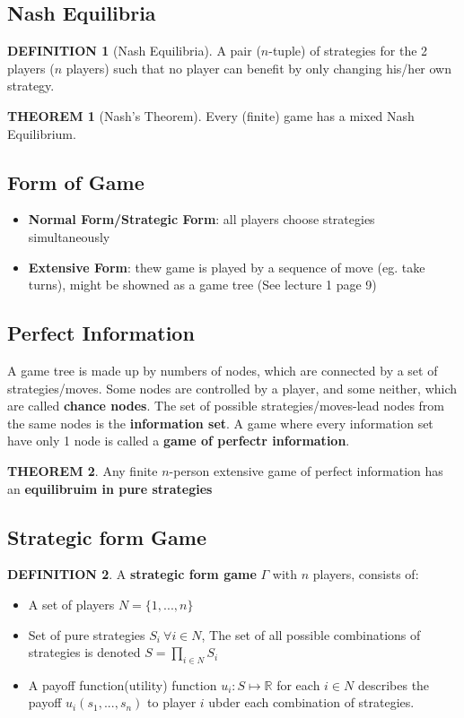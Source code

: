 \documentclass[12pt]{article}
\theoremstyle{definition}
\newtheorem*{definition}{DEFINITION}
\newtheorem*{theorem}{THEOREM}
\begin{document}
    \subsection*{Nash Equilibria}
        \begin{definition}[Nash Equilibria]
            A pair ($n$-tuple) of strategies for the 2 players ($n$ players) such that no player can benefit by only changing his/her own strategy.
        \end{definition}
        \begin{theorem}[Nash's Theorem]
            Every (finite) game has a mixed Nash Equilibrium.
        \end{theorem}
    
    \subsection*{Form of Game}
    \begin{itemize}
        \item \textbf{Normal Form/Strategic Form}: all players choose strategies simultaneously
        \item \textbf{Extensive Form}: thew game is played by a sequence of move (eg. take turns), might be showned as a game tree (See lecture 1 page 9)
    \end{itemize}

    \subsection*{Perfect Information}
    A game tree is made up by numbers of nodes, which are connected by a set of strategies/moves. Some nodes are controlled by a player, and some neither, which are called \textbf{chance nodes}. The set of possible strategies/moves-lead nodes from the same nodes is the \textbf{information set}. A game where every information set have only 1 node is called a \textbf{game of perfectr information}.
    \begin{theorem}
        Any finite $n$-person extensive game of perfect information has an \textbf{equilibruim in pure strategies}
    \end{theorem}

    \subsection*{Strategic form Game}
    \begin{definition}
        A \textbf{strategic form game} $\Gamma$ with $n$ players, consists of:
            \begin{itemize}
                \item A set of players $N = \{1,...,n\}$
                \item Set of pure strategies $S_i \ \forall i \in N$, The set of all possible combinations of strategies is denoted $S = \prod_{i\in N}S_i$
                \item A payoff function(utility) function $u_i:S\mapsto\mathbb{R}$ for each $i \in N$ describes the payoff $u_i(s_1,...,s_n)$ to player $i$ ubder each combination of strategies.
            \end{itemize}
    \end{definition}
\end{document}
